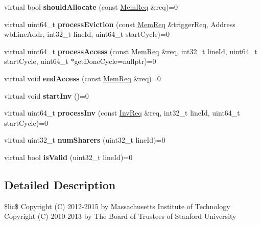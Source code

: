 \begin{DoxyCompactItemize}
\item 
\hypertarget{classCC_acca766f3f8379cf6c17c0fca4b8d3739}{virtual bool {\bfseries should\-Allocate} (const \hyperlink{structMemReq}{Mem\-Req} \&req)=0}\label{classCC_acca766f3f8379cf6c17c0fca4b8d3739}

\item 
\hypertarget{classCC_a336af65349d49287492ddcaa6197c6b0}{virtual uint64\-\_\-t {\bfseries process\-Eviction} (const \hyperlink{structMemReq}{Mem\-Req} \&trigger\-Req, Address wb\-Line\-Addr, int32\-\_\-t line\-Id, uint64\-\_\-t start\-Cycle)=0}\label{classCC_a336af65349d49287492ddcaa6197c6b0}

\item 
\hypertarget{classCC_a193b1f060826af44506030c2a78cebde}{virtual uint64\-\_\-t {\bfseries process\-Access} (const \hyperlink{structMemReq}{Mem\-Req} \&req, int32\-\_\-t line\-Id, uint64\-\_\-t start\-Cycle, uint64\-\_\-t $\ast$get\-Done\-Cycle=nullptr)=0}\label{classCC_a193b1f060826af44506030c2a78cebde}

\item 
\hypertarget{classCC_a66848e057fd8894a77a28e797dbc155c}{virtual void {\bfseries end\-Access} (const \hyperlink{structMemReq}{Mem\-Req} \&req)=0}\label{classCC_a66848e057fd8894a77a28e797dbc155c}

\item 
\hypertarget{classCC_ac2219b6d1f3fea343d37c80cee92b93a}{virtual void {\bfseries start\-Inv} ()=0}\label{classCC_ac2219b6d1f3fea343d37c80cee92b93a}

\item 
\hypertarget{classCC_aa3689bb729527bf2ced5a7020f9fdf65}{virtual uint64\-\_\-t {\bfseries process\-Inv} (const \hyperlink{structInvReq}{Inv\-Req} \&req, int32\-\_\-t line\-Id, uint64\-\_\-t start\-Cycle)=0}\label{classCC_aa3689bb729527bf2ced5a7020f9fdf65}

\item 
\hypertarget{classCC_a369786ed281101d04db2d841b21fd58f}{virtual uint32\-\_\-t {\bfseries num\-Sharers} (uint32\-\_\-t line\-Id)=0}\label{classCC_a369786ed281101d04db2d841b21fd58f}

\item 
\hypertarget{classCC_ad27aac34c05038196e4b59ce97e63a71}{virtual bool {\bfseries is\-Valid} (uint32\-\_\-t line\-Id)=0}\label{classCC_ad27aac34c05038196e4b59ce97e63a71}

\end{DoxyCompactItemize}


\subsection{Detailed Description}
\$lic\$ Copyright (C) 2012-\/2015 by Massachusetts Institute of Technology Copyright (C) 2010-\/2013 by The Board of Trustees of Stanford University


